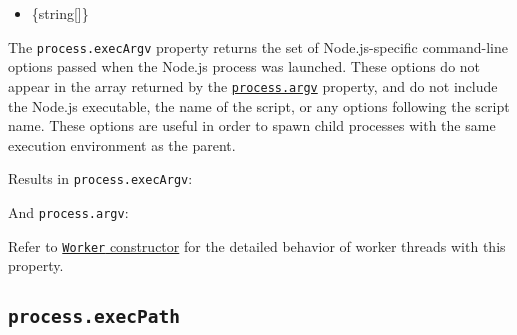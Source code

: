 \begin{itemize}
\tightlist
\item
  \{string{[}{]}\}
\end{itemize}

The \texttt{process.execArgv} property returns the set of
Node.js-specific command-line options passed when the Node.js process
was launched. These options do not appear in the array returned by the
\hyperref[processargv]{\texttt{process.argv}} property, and do not
include the Node.js executable, the name of the script, or any options
following the script name. These options are useful in order to spawn
child processes with the same execution environment as the parent.

\begin{Shaded}
\begin{Highlighting}[]
 
\end{Highlighting}
\end{Shaded}

Results in \texttt{process.execArgv}:

\begin{Shaded}
\begin{Highlighting}[]
\NormalTok{[}\NormalTok{]}
\end{Highlighting}
\end{Shaded}

And \texttt{process.argv}:

\begin{Shaded}
\begin{Highlighting}[]
\NormalTok{[}\OperatorTok{,} \OperatorTok{,} \NormalTok{]}
\end{Highlighting}
\end{Shaded}

Refer to
\href{worker_threads.md\#new-workerfilename-options}{\texttt{Worker}
constructor} for the detailed behavior of worker threads with this
property.

\subsection{\texorpdfstring{\texttt{process.execPath}}{process.execPath}}\label{process.execpath}

